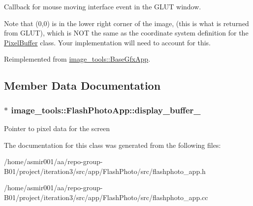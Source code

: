 Callback for mouse moving interface event in the G\+L\+UT window. 

Note that (0,0) is in the lower right corner of the image, (this is what is returned from G\+L\+UT), which is N\+OT the same as the coordinate system definition for the \hyperlink{classimage__tools_1_1PixelBuffer}{Pixel\+Buffer} class. Your implementation will need to account for this. 

Reimplemented from \hyperlink{classimage__tools_1_1BaseGfxApp_ab2aa4111469862051287ba2b9983224d}{image\+\_\+tools\+::\+Base\+Gfx\+App}.



\subsection{Member Data Documentation}
\subsubsection[{\texorpdfstring{display\+\_\+buffer\+\_\+}{display_buffer_}}]{$\ast$ image\+\_\+tools\+::\+Flash\+Photo\+App\+::display\+\_\+buffer\+\_\+\hspace{0.3cm}{\ttfamily [private]}}\hypertarget{classimage__tools_1_1FlashPhotoApp_ad0a08d5606cfc5aa02412303147c612d}{}\label{classimage__tools_1_1FlashPhotoApp_ad0a08d5606cfc5aa02412303147c612d}
Pointer to pixel data for the screen 

The documentation for this class was generated from the following files\+:\begin{DoxyCompactItemize}
\item 
/home/asmir001/aa/repo-\/group-\/\+B01/project/iteration3/src/app/\+Flash\+Photo/src/flashphoto\+\_\+app.\+h\item 
/home/asmir001/aa/repo-\/group-\/\+B01/project/iteration3/src/app/\+Flash\+Photo/src/flashphoto\+\_\+app.\+cc\end{DoxyCompactItemize}
